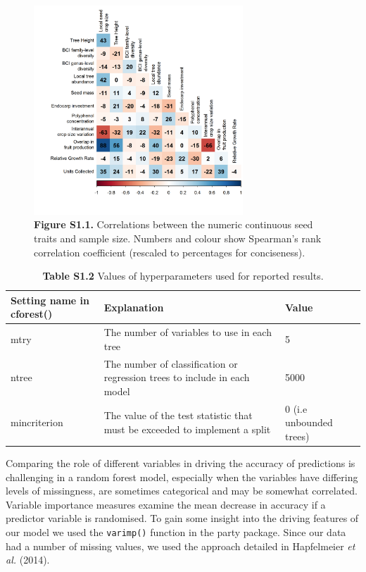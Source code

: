 \documentclass[11pt]{article}
\begin{document}
\begin{figure}[H]
\centering\includegraphics[width=0.7\textwidth]{../Figures/TraitCorrelation.png} 
\caption[]{ \textbf{Figure S1.1.} Correlations between the numeric continuous seed traits and sample size. Numbers and colour show Spearman’s rank correlation coefficient (rescaled to percentages for conciseness). }
\end{figure}


\begin{table}[]
\small
\begin{tabular}{@{}lp{2in}l@{}}
\toprule
Setting name in cforest() & Explanation                                                                & Value                   \\ \midrule
mtry                      & The number of variables to use in each tree                                & 5                       \\
ntree                     & The number of classification or regression trees to include in each model  & 5000                    \\
mincriterion              & The value of the test statistic that must be exceeded to implement a split & 0 (i.e unbounded trees) \\ \bottomrule
\end{tabular}
\caption{\textbf{Table S1.2} Values of hyperparameters used for reported results. }
\end{table}

Comparing the role of different variables in driving the accuracy of predictions is challenging in a random forest model, especially when the variables have differing levels of missingness, are sometimes categorical and may be somewhat correlated. Variable importance measures examine the mean decrease in accuracy if a predictor variable is randomised. To gain some insight into the driving features of our model we used the \texttt{varimp()} function in the party package. Since our data had a number of missing values, we used the approach detailed in Hapfelmeier \emph{et al. }(2014).
\end{document}
